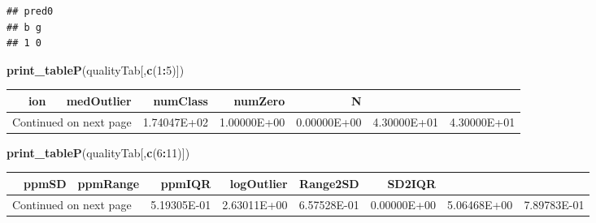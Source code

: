 \documentclass[]{article}
\newenvironment{Shaded}{\begin{snugshade}}{\end{snugshade}}
\newcommand{\KeywordTok}[1]{\textcolor[rgb]{0.13,0.29,0.53}{\textbf{#1}}}
\newcommand{\DecValTok}[1]{\textcolor[rgb]{0.00,0.00,0.81}{#1}}
\newcommand{\OperatorTok}[1]{\textcolor[rgb]{0.81,0.36,0.00}{\textbf{#1}}}
\newcommand{\NormalTok}[1]{#1}
\begin{document}
\begin{verbatim}
## pred0
## b g 
## 1 0
\end{verbatim}

\begin{Shaded}
\begin{Highlighting}[]
  \KeywordTok{print_tableP}\NormalTok{(qualityTab[,}\KeywordTok{c}\NormalTok{(}\DecValTok{1}\OperatorTok{:}\DecValTok{5}\NormalTok{)])}
\end{Highlighting}
\end{Shaded}

\begin{center}
\scriptsize%
\begingroup\small
\begin{longtable}{rrrrrr}
  \hline
 & ion & medOutlier & numClass & numZero & N \\ 
  \hline 
\endhead 
\hline 
\multicolumn{3}{l}{\footnotesize Continued on next page} 
\endfoot 
\endlastfoot 
1 & 1.74047E+02 & 1.00000E+00 & 0.00000E+00 & 4.30000E+01 & 4.30000E+01 \\ 
  \hline
\end{longtable}
\endgroup
\end{center}

\begin{Shaded}
\begin{Highlighting}[]
  \KeywordTok{print_tableP}\NormalTok{(qualityTab[,}\KeywordTok{c}\NormalTok{(}\DecValTok{6}\OperatorTok{:}\DecValTok{11}\NormalTok{)])}
\end{Highlighting}
\end{Shaded}

\begin{center}
\scriptsize%
\begingroup\small
\begin{longtable}{rrrrrrr}
  \hline
 & ppmSD & ppmRange & ppmIQR & logOutlier & Range2SD & SD2IQR \\ 
  \hline 
\endhead 
\hline 
\multicolumn{3}{l}{\footnotesize Continued on next page} 
\endfoot 
\endlastfoot 
1 & 5.19305E-01 & 2.63011E+00 & 6.57528E-01 & 0.00000E+00 & 5.06468E+00 & 7.89783E-01 \\ 
  \hline
\end{longtable}
\endgroup
\end{center}
\end{document}
